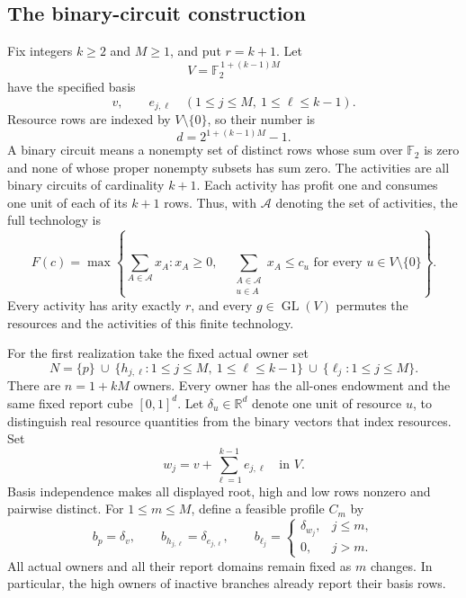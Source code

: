 \documentclass[11pt]{article}
\newcommand{\R}{\mathbb R}
\theoremstyle{definition}\newtheorem{definition}[theorem]{Definition}
\theoremstyle{remark}\newtheorem{remark}[theorem]{Remark}
\begin{document}
\subsection{The binary-circuit construction}
\label{arity:construction-section}

Fix integers $k\geq2$ and $M\geq1$, and put $r=k+1$.  Let
\[
  V=\mathbb F_2^{\,1+(k-1)M}
\]
have the specified basis
\[
  v,\qquad e_{j,\ell}\quad
  (1\leq j\leq M,\ 1\leq\ell\leq k-1).
\]
Resource rows are indexed by $V\setminus\{0\}$, so their number is
\begin{equation}
  d=2^{1+(k-1)M}-1.
  \label{arity:row-count}
\end{equation}
A binary circuit means a nonempty set of distinct rows whose sum over
$\mathbb F_2$ is zero and none of whose proper nonempty subsets has sum zero.
The activities are all binary circuits of cardinality $k+1$.  Each activity
has profit one and consumes one unit of each of its $k+1$ rows.  Thus, with
$\mathcal A$ denoting the set of activities, the full technology is
\begin{equation}
  F(c)=\max\left\{
    \sum_{A\in\mathcal A}x_A:
    x_A\geq0,\quad
    \sum_{\substack{A\in\mathcal A\\u\in A}}x_A\leq c_u
       \text{ for every }u\in V\setminus\{0\}
  \right\}.
  \label{arity:technology}
\end{equation}
Every activity has arity exactly $r$, and every $g\in\operatorname{GL}(V)$
permutes the resources and the activities of this finite technology.

For the first realization take the fixed actual owner set
\[
  N=\{p\}\ \cup\
  \{h_{j,\ell}:1\leq j\leq M,\ 1\leq\ell\leq k-1\}
  \ \cup\ \{\ell_j:1\leq j\leq M\}.
\]
There are $n=1+kM$ owners.  Every owner has the all-ones endowment and the
same fixed report cube $[0,1]^d$.  Let $\delta_u\in\R^d$ denote one unit of
resource $u$, to distinguish real resource quantities from the binary
vectors that index resources.  Set
\[
  w_j=v+\sum_{\ell=1}^{k-1}e_{j,\ell}\quad\text{in }V.
\]
Basis independence makes all displayed root, high and low rows nonzero and
pairwise distinct.
For $1\leq m\leq M$, define a feasible profile $C_m$ by
\begin{equation}
  b_p=\delta_v,\qquad
  b_{h_{j,\ell}}=\delta_{e_{j,\ell}},\qquad
  b_{\ell_j}=
  \begin{cases}
    \delta_{w_j},&j\leq m,\\
    0,&j>m.
  \end{cases}
  \label{arity:profiles}
\end{equation}
All actual owners and all their report domains remain fixed as $m$ changes.
In particular, the high owners of inactive branches already report their
basis rows.
\end{document}
